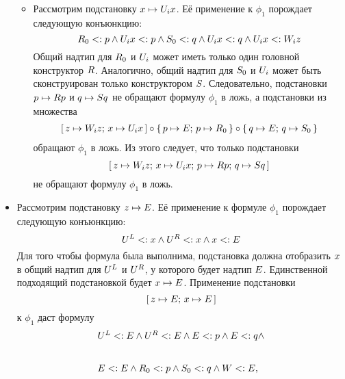 \begin{proof*}
\begin{itemize}
\begin{itemize}
            \item
                Рассмотрим подстановку  $x \mapsto {U}_{i}x$. Её применение к  $\phi_{1}$ порождает следующую конъюнкцию:
                \[
                 {R}_{0} <: p \land {U}_{i}x <: p \land {S}_{0} <: q \land {U}_{i}x <: q \land {U}_{i}x <: {W}_{i}z
                \]
                Общий надтип для ${R}_{0}$ и ${U}_{i}$ может иметь только один головной конструктор ${R}$. Аналогично, общий надтип для  ${S}_{0}$ и ${U}_{i}$ может быть сконструирован только конструктором ${S}$. Следовательно, подстановки $p \mapsto {R}p$ и $q \mapsto {S}q$ не обращают формулу $\phi_{1}$ в ложь, а подстановки из множества
                \[
                    \begin{array}{l}
                        \textrm{[} \, z \mapsto {W}_{i}z; \, x \mapsto {U}_{i}x \, \textrm{]} \circ
                        \lbrace \, p \mapsto {E}; \, p \mapsto {R}_{0} \, \rbrace \circ \lbrace \, q \mapsto {E}; \, q \mapsto {S}_{0} \, \rbrace
                    \end{array}
                \] обращают $\phi_1$ в ложь.
                Из этого следует, что только подстановки
                \[
                    \textrm{[} \, z \mapsto {W}_{i}z; \, x \mapsto {U}_{i}x; \, p \mapsto {R}p; \, q \mapsto {S}q \, \textrm{]}
                \] не обращают формулу $\phi_{1}$ в ложь.
        \end{itemize}
    \item
        Рассмотрим подстановку $z \mapsto {E}$. Её применение к формуле $\phi_{1}$ порождает следующую конъюнкцию:
        \[
         {U}^{L} <: x \land {U}^{R} <: x \land x <: {E}
        \]
        Для того чтобы формула была выполнима, подстановка должна отобразить $x$ в общий надтип для ${U}^{L}$ и ${U}^{R}$, у которого будет надтип ${E}$. Единственной подходящий подстановкой будет $x \mapsto {E}$. Применение подстановки \[\textrm{[} \, z \mapsto {E}; \, x \mapsto {E} \, \textrm{]}\] к $\phi_{1}$ даст формулу
        \[
            \begin{array}{l}
                {U}^{L} <: {E} \land {U}^{R} <: {E} \land {E} <: p \land {E} <: q \land \\[1em]\\ {E} <: {E} \land {R}_{0} <: p \land {S}_{0} <: q \land {W} <: {E},

\end{array}\]
\end{itemize}
\end{proof*}
